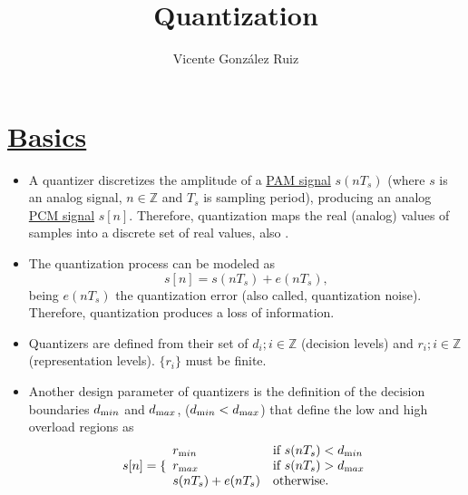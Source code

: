 
\title{Quantization}

\author{Vicente González Ruiz}

\maketitle

\section{\href{https://en.wikipedia.org/wiki/Quantization\_(signal\_processing)}{Basics}}
\begin{itemize}
\tightlist

\item
  A quantizer discretizes the amplitude of a
  \href{https://en.wikipedia.org/wiki/Pulse-amplitude_modulation}{PAM
    signal} \(s(nT_s)\) (where $s$ is an analog signal,
  $n\in{\mathbb{Z}}$ and $T_s$ is sampling period), producing an
  analog
  \href{https://en.wikipedia.org/wiki/Pulse-code_modulation}{PCM
    signal} $s[n]$. Therefore, quantization maps the real (analog)
  values of samples into a discrete set of real values, also
  \cite{vetterli1995wavelets}.

\item
  The quantization process can be modeled as
  \begin{equation}
    s[n] = s(nT_s) + e(nT_s),
  \end{equation}
  being \(e(nT_s)\) the quantization error (also called, quantization
  noise). Therefore, quantization produces a loss of information.

\item
  Quantizers are defined from their set of \(d_i; i\in {\mathbb{Z}}\)
  (decision levels) and \(r_i; i\in {\mathbb{Z}}\) (representation
  levels). $\{r_i\}$ must be finite.

\item Another design parameter of quantizers is the definition of the
  decision boundaries $d_{\text min}$ and $d_{\text max}$, ($d_{\text min}<d_{\text max}$) that define the low and high
  overload regions as
  \begin{equation}
    s[n] = \{\begin{array}{ll}
    r_{\text min} & \text{if $s(nT_s)<d_{\text min}$} \\
    r_{\text max} & \text{if $s(nT_s)>d_{\text max}$} \\
    s(nT_s)+e(nT_s) & \text{otherwise}.
    \end{array}
  \end{equation}
  

\end{itemize}
